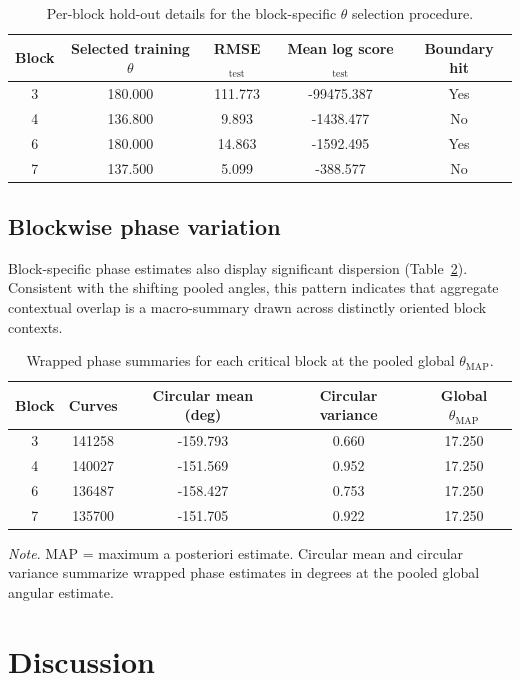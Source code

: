 \documentclass[12pt]{article}
\newcommand{\tablenote}[1]{%
\vspace{0.35em}
\begin{flushleft}
\footnotesize\emph{Note}. #1
\end{flushleft}
}
\begin{document}
\begin{table}[htbp]
\centering
\caption{Per-block hold-out details for the block-specific \(\theta\) selection procedure.}
\label{tab:block-theta-holdout}
\small
\begin{tabular}{@{}ccccc@{}}
\toprule
Block & Selected training \(\theta\) & RMSE$_{\text{test}}$ & Mean log score$_{\text{test}}$ & Boundary hit \\
\midrule
3 & 180.000 & 111.773 & -99475.387 & Yes \\
4 & 136.800 & 9.893 & -1438.477 & No \\
6 & 180.000 & 14.863 & -1592.495 & Yes \\
7 & 137.500 & 5.099 & -388.577 & No \\
\bottomrule
\end{tabular}
\end{table}

\subsection{Blockwise phase variation}
Block-specific phase estimates also display significant dispersion (Table~\ref{tab:block-phase-summary}). Consistent with the shifting pooled angles, this pattern indicates that aggregate contextual overlap is a macro-summary drawn across distinctly oriented block contexts.

\begin{table}[htbp]
\centering
\caption{Wrapped phase summaries for each critical block at the pooled global \(\theta_{\mathrm{MAP}}\).}
\label{tab:block-phase-summary}
\small
\begin{tabular}{@{}ccccc@{}}
\toprule
Block & Curves & Circular mean (deg) & Circular variance & Global \(\theta_{\mathrm{MAP}}\) \\
\midrule
3 & 141258 & -159.793 & 0.660 & 17.250 \\
4 & 140027 & -151.569 & 0.952 & 17.250 \\
6 & 136487 & -158.427 & 0.753 & 17.250 \\
7 & 135700 & -151.705 & 0.922 & 17.250 \\
\bottomrule
\end{tabular}
\tablenote{MAP = maximum a posteriori estimate. Circular mean and circular variance summarize wrapped phase estimates in degrees at the pooled global angular estimate.}
\end{table}

\section{Discussion}
\end{document}
